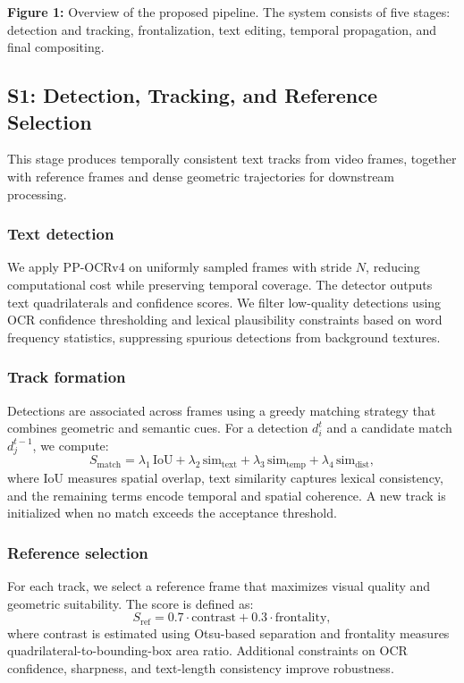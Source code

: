 \noindent\textbf{Figure 1:} Overview of the proposed pipeline. The system consists of five stages: detection and tracking, frontalization, text editing, temporal propagation, and final compositing.

\subsection{S1: Detection, Tracking, and Reference Selection}

This stage produces temporally consistent text tracks from video frames, together with reference frames and dense geometric trajectories for downstream processing.

\subsubsection{Text detection}

We apply PP-OCRv4 on uniformly sampled frames with stride $N$, reducing computational cost while preserving temporal coverage. The detector outputs text quadrilaterals and confidence scores. We filter low-quality detections using OCR confidence thresholding and lexical plausibility constraints based on word frequency statistics, suppressing spurious detections from background textures.

\subsubsection{Track formation}

Detections are associated across frames using a greedy matching strategy that combines geometric and semantic cues. For a detection $d_i^t$ and a candidate match $d_j^{t-1}$, we compute:
\[
S_{\text{match}} = \lambda_1 \, \text{IoU} + \lambda_2 \, \text{sim}_{\text{text}} + \lambda_3 \, \text{sim}_{\text{temp}} + \lambda_4 \, \text{sim}_{\text{dist}},
\]
where IoU measures spatial overlap, text similarity captures lexical consistency, and the remaining terms encode temporal and spatial coherence. A new track is initialized when no match exceeds the acceptance threshold.

\subsubsection{Reference selection}

For each track, we select a reference frame that maximizes visual quality and geometric suitability. The score is defined as:
\[
S_{\text{ref}} = 0.7 \cdot \text{contrast} + 0.3 \cdot \text{frontality},
\]
where contrast is estimated using Otsu-based separation and frontality measures quadrilateral-to-bounding-box area ratio. Additional constraints on OCR confidence, sharpness, and text-length consistency improve robustness.

